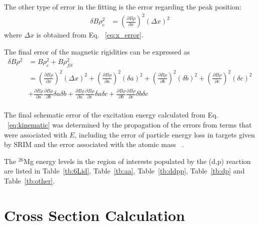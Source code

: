 The other type of error in the fitting is the error regarding the peak position:
\begin{equation}
    \label{eq:b-rho_pos}
    \begin{aligned}
    \delta B \rho_{c}^2 &=   (\frac{\partial B\rho}{\partial x})^2 (\Delta x)^2
    \end{aligned}
\end{equation}
where $\Delta x$ is obtained from Eq. ~\ref{eq:x_error}.

The final error of the magnetic rigidities can be expressed as
\begin{equation}
    \label{eq:b-rho_tot}
    \begin{aligned}
    \delta B \rho^2 &= B\rho_{c}^2 + B\rho_{fit}^2 \\
                    &=  (\frac{\partial B\rho}{\partial x})^2 (\Delta x)^2
                     + (\frac{\partial B\rho}{\partial a})^2 (\delta a)^2 + (\frac{\partial B\rho}{\partial b})^2 (\delta b)^2 + (\frac{\partial B\rho}{\partial c})^2 (\delta c)^2 \\
                    & + \frac{\partial B\rho}{\partial a} \frac{\partial B\rho}{ \partial b} \delta a \delta b
                     + \frac{\partial B\rho}{\partial a} \frac{\partial B\rho}{ \partial c} \delta a \delta c
                     + \frac{\partial B\rho}{\partial b} \frac{\partial B\rho}{ \partial c} \delta b \delta c    \\
    \end{aligned}
\end{equation}

The final schematic error of the excitation energy calculated from  Eq. ~\ref{eq:kinematic} was determined by the propagation of the errors from terms that were associated with $E$, including the error of particle energy loss in targets given by SRIM and the error associated with the atomic mass  ~\citep{mass_excess}.


The $^{26}$Mg energy levels in the region of interests populated by the (d,p) reaction are listed in Table~\ref{tb:6Lid}, Table~\ref{tb:aa}, Table~\ref{tb:ddpp}, Table~\ref{tb:dp} and Table~\ref{tb:other}.

\section{Cross Section Calculation}

